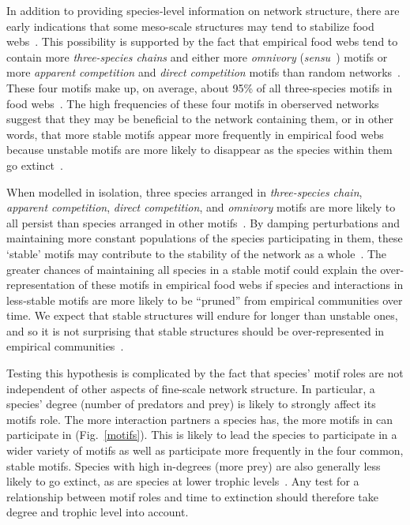 \documentclass[12pt]{article}
\begin{document}
	
    In addition to providing species-level information on network structure, there are early indications that some meso-scale structures may tend to stabilize food webs~\citep{Prill2005,Borrelli2015,Monteiro2016}. 
    This possibility is supported by the fact that empirical food webs tend to contain more \emph{three-species chains} and either more \emph{omnivory} (\emph{sensu}~\citealp[]{Thompson2007b}) motifs or more \emph{apparent competition} and \emph{direct competition} motifs than random networks~\citep{Stouffer2007}. 
    These four motifs make up, on average, about 95\% of all three-species motifs in food webs~\citep{Stouffer2010b}. 
    The high frequencies of these four motifs in oberserved networks suggest that they may be beneficial to the network containing them, or in other words, that more stable motifs appear more frequently in empirical food webs because unstable motifs are more likely to disappear as the species within them go extinct~\citep{Borrelli2015,Borrelli2015a}.

	When modelled in isolation, three species arranged in \emph{three-species chain}, \emph{apparent competition}, \emph{direct competition}, and \emph{omnivory} motifs are more likely to all persist than species arranged in other motifs~\citep{Borrelli2015a}.
	By damping perturbations and maintaining more constant populations of the species participating in them, these `stable' motifs may contribute to the stability of the network as a whole~\citep{Borrelli2015a}. 
    The greater chances of maintaining all species in a stable motif could explain the over-representation of these motifs in empirical food webs if species and interactions in less-stable motifs are more likely to be ``pruned'' from empirical communities over time. We expect that stable structures will endure for longer than unstable ones, and so it is not surprising that stable structures should be over-represented in empirical communities~\citep{Borrelli2015}.


    Testing this hypothesis is complicated by the fact that species' motif roles are not independent of other aspects of fine-scale network structure. 
    In particular, a species' degree (number of predators and prey) is likely to strongly affect its motifs role.
    The more interaction partners a species has, the more motifs in can participate in (Fig.~\ref{motifs}).
    This is likely to lead the species to participate in a wider variety of motifs as well as participate more frequently in the four common, stable motifs.
    Species with high in-degrees (more prey) are also generally less likely to go extinct, as are species at lower trophic levels~\citep{Cirtwill2018FoodWebs}.
    Any test for a relationship between motif roles and time to extinction should therefore take degree and trophic level into account.
\end{document}
